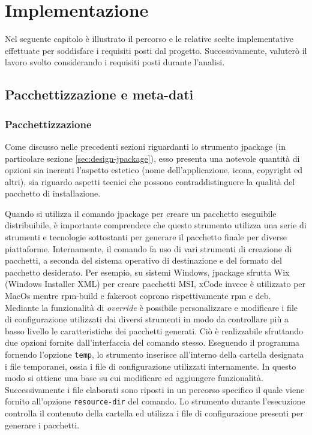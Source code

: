 
\chapter{Implementazione}

Nel seguente capitolo è illustrato il percorso e le relative scelte implementative effettuate per soddisfare i requisiti posti dal progetto. Successivamente, valuterò il lavoro svolto considerando i requisiti posti durante l'analisi.

\section{Pacchettizzazione e meta-dati}

\subsection{Pacchettizzazione}

Come discusso nelle precedenti sezioni riguardanti lo strumento jpackage (in particolare sezione \ref{sec:design-jpackage}), esso presenta una notevole quantità di opzioni sia inerenti l'aspetto estetico (nome dell'applicazione, icona, copyright ed altri), sia riguardo aspetti tecnici che possono contraddistinguere la qualità del pacchetto di installazione. 

Quando si utilizza il comando jpackage per creare un pacchetto eseguibile distribuibile, è importante comprendere che questo strumento utilizza una serie di strumenti e tecnologie sottostanti per generare il pacchetto finale per diverse piattaforme. Internamente, il comando fa uso di vari strumenti di creazione di pacchetti, a seconda del sistema operativo di destinazione e del formato del pacchetto desiderato. Per esempio, su sistemi Windows, jpackage sfrutta Wix (Windows Installer XML) per creare pacchetti MSI, xCode invece è utilizzato per MacOs mentre rpm-build e fakeroot coprono rispettivamente rpm e deb. Mediante la funzionalità di \textit{override} è possibile personalizzare e modificare i file di configurazione utilizzati dai diversi strumenti in modo da controllare più a basso livello le caratteristiche dei pacchetti generati. Ciò è realizzabile sfruttando due opzioni fornite dall'interfaccia del comando stesso. Eseguendo il programma fornendo l'opzione \texttt{temp}, lo strumento inserisce all'interno della cartella designata i file temporanei, ossia i file di configurazione utilizzati internamente. In questo modo si ottiene una base su cui modificare ed aggiungere funzionalità. Successivamente i file elaborati sono riposti in un percorso specifico il quale viene fornito all'opzione \texttt{resource-dir} del comando. Lo strumento durante l'esecuzione controlla il contenuto della cartella ed utilizza i file di configurazione presenti per generare i pacchetti. 

